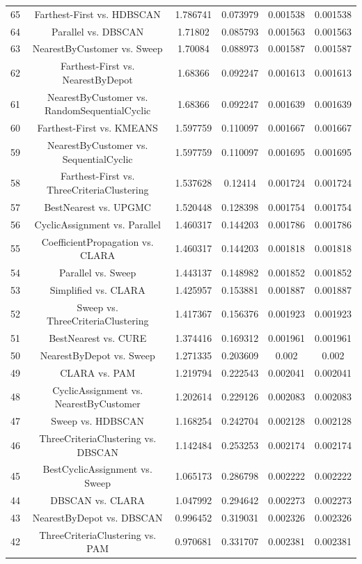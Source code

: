 \documentclass[a4paper,10pt]{article}
\begin{document}
\begin{landscape}
\begin{table}[!htp]
\begin{tabular}{cccccc}
65&Farthest-First vs. HDBSCAN&1.786741&0.073979&0.001538&0.001538\\
64&Parallel vs. DBSCAN&1.71802&0.085793&0.001563&0.001563\\
63&NearestByCustomer vs. Sweep&1.70084&0.088973&0.001587&0.001587\\
62&Farthest-First vs. NearestByDepot&1.68366&0.092247&0.001613&0.001613\\
61&NearestByCustomer vs. RandomSequentialCyclic&1.68366&0.092247&0.001639&0.001639\\
60&Farthest-First vs. KMEANS&1.597759&0.110097&0.001667&0.001667\\
59&NearestByCustomer vs. SequentialCyclic&1.597759&0.110097&0.001695&0.001695\\
58&Farthest-First vs. ThreeCriteriaClustering&1.537628&0.12414&0.001724&0.001724\\
57&BestNearest vs. UPGMC&1.520448&0.128398&0.001754&0.001754\\
56&CyclicAssignment vs. Parallel&1.460317&0.144203&0.001786&0.001786\\
55&CoefficientPropagation vs. CLARA&1.460317&0.144203&0.001818&0.001818\\
54&Parallel vs. Sweep&1.443137&0.148982&0.001852&0.001852\\
53&Simplified vs. CLARA&1.425957&0.153881&0.001887&0.001887\\
52&Sweep vs. ThreeCriteriaClustering&1.417367&0.156376&0.001923&0.001923\\
51&BestNearest vs. CURE&1.374416&0.169312&0.001961&0.001961\\
50&NearestByDepot vs. Sweep&1.271335&0.203609&0.002&0.002\\
49&CLARA vs. PAM&1.219794&0.222543&0.002041&0.002041\\
48&CyclicAssignment vs. NearestByCustomer&1.202614&0.229126&0.002083&0.002083\\
47&Sweep vs. HDBSCAN&1.168254&0.242704&0.002128&0.002128\\
46&ThreeCriteriaClustering vs. DBSCAN&1.142484&0.253253&0.002174&0.002174\\
45&BestCyclicAssignment vs. Sweep&1.065173&0.286798&0.002222&0.002222\\
44&DBSCAN vs. CLARA&1.047992&0.294642&0.002273&0.002273\\
43&NearestByDepot vs. DBSCAN&0.996452&0.319031&0.002326&0.002326\\
42&ThreeCriteriaClustering vs. PAM&0.970681&0.331707&0.002381&0.002381\\

\end{tabular}
\end{table}
\end{landscape}
\end{document}
